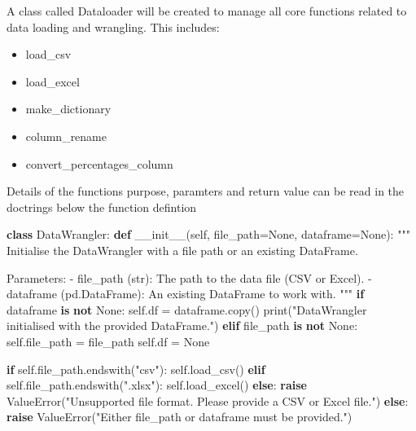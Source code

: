 \documentclass[
  letterpaper,
  DIV=11,
  numbers=noendperiod]{scrartcl}
\newenvironment{Shaded}{\begin{snugshade}}{\end{snugshade}}
\newcommand{\BuiltInTok}[1]{\textcolor[rgb]{0.00,0.23,0.31}{#1}}
\newcommand{\CommentTok}[1]{\textcolor[rgb]{0.37,0.37,0.37}{#1}}
\newcommand{\ControlFlowTok}[1]{\textcolor[rgb]{0.00,0.23,0.31}{\textbf{#1}}}
\newcommand{\FunctionTok}[1]{\textcolor[rgb]{0.28,0.35,0.67}{#1}}
\newcommand{\KeywordTok}[1]{\textcolor[rgb]{0.00,0.23,0.31}{\textbf{#1}}}
\newcommand{\NormalTok}[1]{\textcolor[rgb]{0.00,0.23,0.31}{#1}}
\newcommand{\OperatorTok}[1]{\textcolor[rgb]{0.37,0.37,0.37}{#1}}
\newcommand{\PreprocessorTok}[1]{\textcolor[rgb]{0.68,0.00,0.00}{#1}}
\newcommand{\StringTok}[1]{\textcolor[rgb]{0.13,0.47,0.30}{#1}}
\newcommand{\VariableTok}[1]{\textcolor[rgb]{0.07,0.07,0.07}{#1}}
\providecommand{\tightlist}{%
  \setlength{\itemsep}{0pt}\setlength{\parskip}{0pt}}\usepackage{longtable,booktabs,array}
\begin{document}
A class called Dataloader will be created to manage all core functions
related to data loading and wrangling. This includes:

\begin{itemize}
\tightlist
\item
  load\_csv
\item
  load\_excel
\item
  make\_dictionary
\item
  column\_rename
\item
  convert\_percentages\_column
\end{itemize}

Details of the functions purpose, paramters and return value can be read
in the doctrings below the function defintion

\begin{Shaded}
\begin{Highlighting}[]
\KeywordTok{class}\NormalTok{ DataWrangler: }
    \KeywordTok{def} \FunctionTok{\_\_init\_\_}\NormalTok{(}\VariableTok{self}\NormalTok{, file\_path}\OperatorTok{=}\VariableTok{None}\NormalTok{, dataframe}\OperatorTok{=}\VariableTok{None}\NormalTok{):}
        \CommentTok{"""}
\CommentTok{        Initialise the DataWrangler with a file path or an existing DataFrame.}

\CommentTok{        Parameters:}
\CommentTok{        {-} file\_path (str): The path to the data file (CSV or Excel).}
\CommentTok{        {-} dataframe (pd.DataFrame): An existing DataFrame to work with.}
\CommentTok{        """}
        \ControlFlowTok{if}\NormalTok{ dataframe }\KeywordTok{is} \KeywordTok{not} \VariableTok{None}\NormalTok{:}
            \VariableTok{self}\NormalTok{.df }\OperatorTok{=}\NormalTok{ dataframe.copy()}
            \BuiltInTok{print}\NormalTok{(}\StringTok{"DataWrangler initialised with the provided DataFrame."}\NormalTok{)}
        \ControlFlowTok{elif}\NormalTok{ file\_path }\KeywordTok{is} \KeywordTok{not} \VariableTok{None}\NormalTok{:}
            \VariableTok{self}\NormalTok{.file\_path }\OperatorTok{=}\NormalTok{ file\_path}
            \VariableTok{self}\NormalTok{.df }\OperatorTok{=} \VariableTok{None}

            \ControlFlowTok{if} \VariableTok{self}\NormalTok{.file\_path.endswith(}\StringTok{"csv"}\NormalTok{):}
                \VariableTok{self}\NormalTok{.load\_csv()}
            \ControlFlowTok{elif} \VariableTok{self}\NormalTok{.file\_path.endswith(}\StringTok{".xlsx"}\NormalTok{):}
                \VariableTok{self}\NormalTok{.load\_excel()}
            \ControlFlowTok{else}\NormalTok{:}
                \ControlFlowTok{raise} \PreprocessorTok{ValueError}\NormalTok{(}\StringTok{"Unsupported file format. Please provide a CSV or Excel file."}\NormalTok{)}
        \ControlFlowTok{else}\NormalTok{:}
            \ControlFlowTok{raise} \PreprocessorTok{ValueError}\NormalTok{(}\StringTok{"Either file\_path or dataframe must be provided."}\NormalTok{)}


\end{Highlighting}
\end{Shaded}
\end{document}
